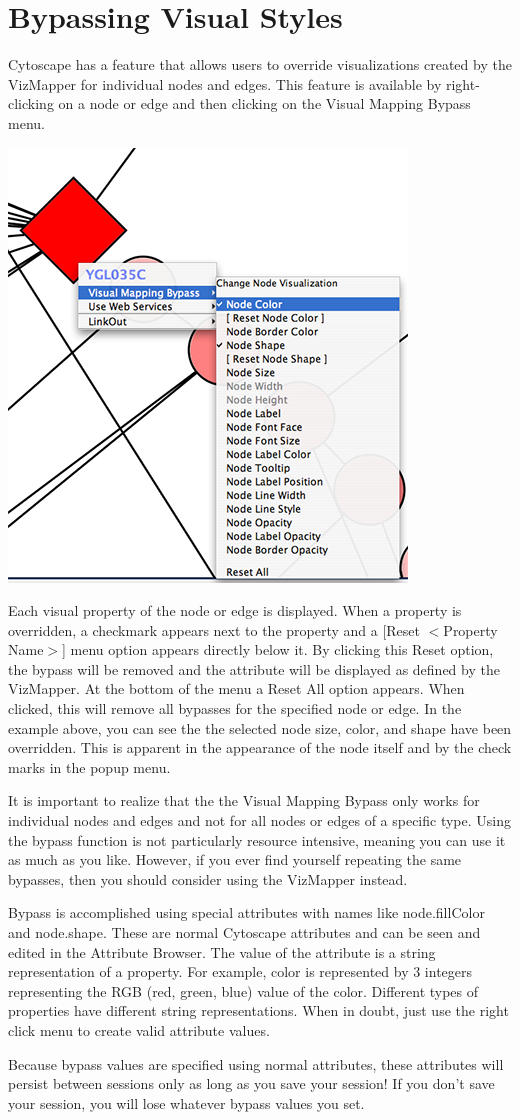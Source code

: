  

\section*{Bypassing Visual Styles}


 Cytoscape has a feature that allows users to override visualizations created by the VizMapper for individual nodes and edges. This feature is available by right-clicking on a node or edge and then clicking on the Visual Mapping Bypass menu. 

\includegraphics[width=.6\textwidth]{images/VizmapBypass26.png} 


 Each visual property of the node or edge is displayed. When a property is overridden, a checkmark appears next to the property and a [Reset $<$Property Name$>$] menu option appears directly below it. By clicking this Reset option, the bypass will be removed and the attribute will be displayed as defined by the VizMapper. At the bottom of the menu a Reset All option appears. When clicked, this will remove all bypasses for the specified node or edge. In the example above, you can see the the selected node size, color, and shape have been overridden. This is apparent in the appearance of the node itself and by the check marks in the popup menu. 


 It is important to realize that the the Visual Mapping Bypass only works for individual nodes and edges and not for all nodes or edges of a specific type. Using the bypass function is not particularly resource intensive, meaning you can use it as much as you like. However, if you ever find yourself repeating the same bypasses, then you should consider using the VizMapper instead. 


 Bypass is accomplished using special attributes with names like node.fillColor and node.shape. These are normal Cytoscape attributes and can be seen and edited in the Attribute Browser. The value of the attribute is a string representation of a property. For example, color is represented by 3 integers representing the RGB (red, green, blue) value of the color. Different types of properties have different string representations. When in doubt, just use the right click menu to create valid attribute values. 


 Because bypass values are specified using normal attributes, these attributes will persist between sessions only as long as you save your session! If you don't save your session, you will lose whatever bypass values you set. 
